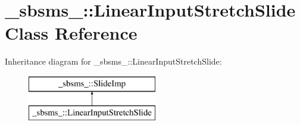 \hypertarget{class__sbsms___1_1_linear_input_stretch_slide}{}\section{\+\_\+sbsms\+\_\+\+:\+:Linear\+Input\+Stretch\+Slide Class Reference}
\label{class__sbsms___1_1_linear_input_stretch_slide}
Inheritance diagram for \+\_\+sbsms\+\_\+\+:\+:Linear\+Input\+Stretch\+Slide\+:\begin{figure}[H]
\begin{center}
\leavevmode
\includegraphics[height=2.000000cm]{class__sbsms___1_1_linear_input_stretch_slide}
\end{center}
\end{figure}
